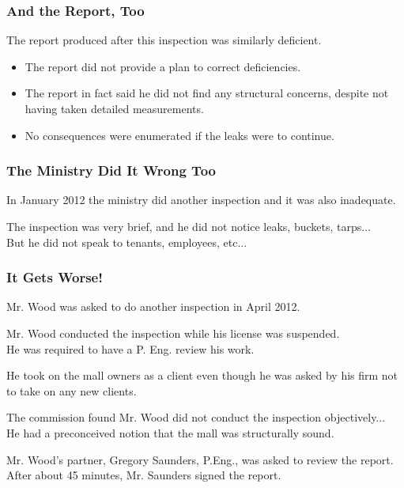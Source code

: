 \begin{frame}
\frametitle{And the Report, Too}

The report produced after this inspection was similarly deficient.

\begin{itemize}
	\item The report did not provide a plan to correct deficiencies.
	\item The report in fact said he did not find any structural concerns, despite not having taken detailed measurements.
	\item No consequences were enumerated if the leaks were to continue.
\end{itemize}

\end{frame}



\begin{frame}
\frametitle{The Ministry Did It Wrong Too}

In January 2012 the ministry did another inspection and it was also inadequate.

The inspection was very brief, and he did not notice leaks, buckets, tarps...\\
\quad But he did not speak to tenants, employees, etc...

\end{frame}



\begin{frame}
\frametitle{It Gets Worse!}

Mr. Wood was asked to do another inspection in April 2012.

Mr. Wood conducted the inspection while his license was suspended.\\
\quad He was required to have a P. Eng. review his work.

He took on the mall owners as a client even though he was asked by his firm not to take on any new clients.

The commission found Mr. Wood did not conduct the inspection objectively...\\
\quad He had a preconceived notion that the mall was structurally sound.

Mr. Wood's partner, Gregory Saunders, P.Eng., was asked to review the report.\\
\quad After about 45 minutes, Mr. Saunders signed the report.

\end{frame}



